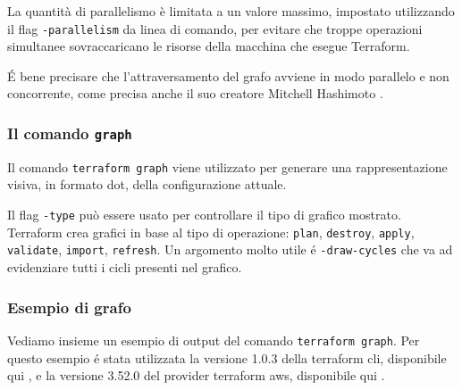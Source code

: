 \documentclass[12pt, a4paper, titlepage]{article}
\begin{document}
La quantità di parallelismo è limitata a un valore massimo, impostato utilizzando il flag \texttt{-parallelism} da linea di comando, per evitare che troppe operazioni simultanee sovraccaricano le risorse della macchina che esegue Terraform.

\begin{tcolorbox}
É bene precisare che l'attraversamento del grafo avviene in modo parallelo e non concorrente, come precisa anche il suo creatore Mitchell Hashimoto \cite{github_issue_11766}.
\end{tcolorbox}

\subsubsection{Il comando \texttt{graph}}

Il comando \texttt{terraform graph} viene utilizzato per generare una rappresentazione visiva, in formato \gls{dot}, della configurazione attuale.

Il flag \texttt{-type} può essere usato per controllare il tipo di grafico mostrato. Terraform crea grafici in base al tipo di operazione: \texttt{plan}, \texttt{destroy}, \texttt{apply}, \texttt{validate}, \texttt{import}, \texttt{refresh}.  Un argomento molto utile é \texttt{-draw-cycles}  che va ad evidenziare tutti i cicli presenti nel grafico.

\subsubsection{Esempio di grafo} 
Vediamo insieme un esempio di output del comando \texttt{terraform graph}. Per questo esempio é stata utilizzata la versione 1.0.3 della terraform cli, disponibile qui \cite{terraform_cli}, e la versione 3.52.0 del provider terraform \gls{aws}, disponibile qui \cite{terraform_aws}.
\end{document}
